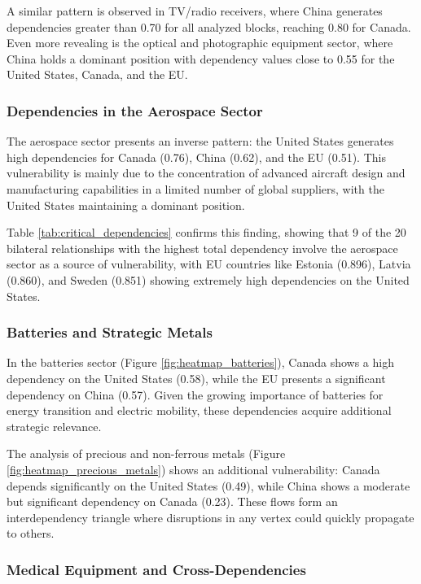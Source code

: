 \documentclass[final,1p,times,authoryear]{elsarticle}
\begin{document}
A similar pattern is observed in TV/radio receivers, where China generates dependencies greater than 0.70 for all analyzed blocks, reaching 0.80 for Canada. Even more revealing is the optical and photographic equipment sector, where China holds a dominant position with dependency values close to 0.55 for the United States, Canada, and the EU.

\subsubsection{Dependencies in the Aerospace Sector}

The aerospace sector presents an inverse pattern: the United States generates high dependencies for Canada (0.76), China (0.62), and the EU (0.51). This vulnerability is mainly due to the concentration of advanced aircraft design and manufacturing capabilities in a limited number of global suppliers, with the United States maintaining a dominant position.

Table \ref{tab:critical_dependencies} confirms this finding, showing that 9 of the 20 bilateral relationships with the highest total dependency involve the aerospace sector as a source of vulnerability, with EU countries like Estonia (0.896), Latvia (0.860), and Sweden (0.851) showing extremely high dependencies on the United States.

\subsubsection{Batteries and Strategic Metals}

In the batteries sector (Figure \ref{fig:heatmap_batteries}), Canada shows a high dependency on the United States (0.58), while the EU presents a significant dependency on China (0.57). Given the growing importance of batteries for energy transition and electric mobility, these dependencies acquire additional strategic relevance.

The analysis of precious and non-ferrous metals (Figure \ref{fig:heatmap_precious_metals}) shows an additional vulnerability: Canada depends significantly on the United States (0.49), while China shows a moderate but significant dependency on Canada (0.23). These flows form an interdependency triangle where disruptions in any vertex could quickly propagate to others.

\subsubsection{Medical Equipment and Cross-Dependencies}
\end{document}
